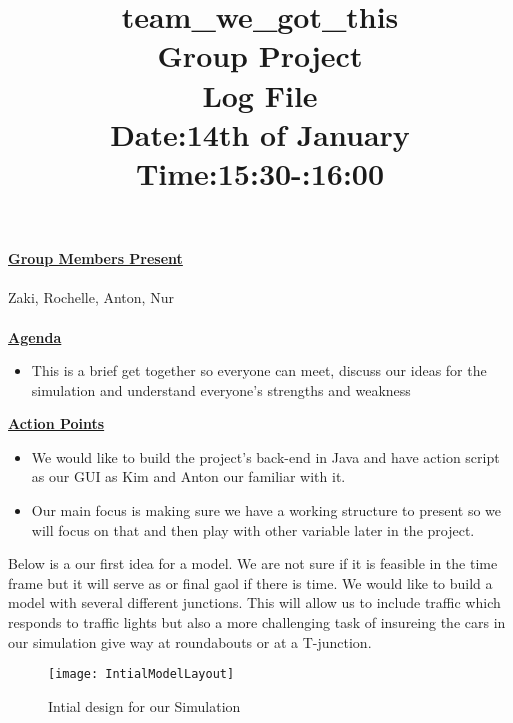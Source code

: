 \documentclass{article}
\begin{document}
	\title{team\_we\_got\_this\\ Group Project \\ Log File\\Date:14th of January\\Time:15:30-:16:00}
	
	\maketitle
	
	
	{\bf\underline{Group Members Present}}\\\\
	Zaki, Rochelle, Anton, Nur\\\\
		
	
{\underline	{\bf Agenda}}\\
	\begin{itemize}
		\item This is a brief get together so everyone can meet, discuss our ideas for the simulation and understand everyone's strengths and weakness
	\end{itemize}
	
	
	
	
	{\underline {\bf Action Points}}\\
	\begin{itemize}
		\item We would like to build the project's back-end in Java and have action script as our GUI as Kim and Anton our familiar with it. 
		\item Our main focus is making sure we have a working structure to present so we will focus on that and then play with other variable later in the project. 
	\end{itemize}
	
	
\newpage
\noindent Below is a our first idea for a model. We are not sure if it is feasible in the time frame but it will serve as or final gaol if there is time. We would like to build a model with several different junctions. This will allow us to include traffic which responds to traffic lights but also a more challenging task of insureing the cars in our simulation give way at roundabouts or at a T-junction.


\begin{figure}[h]
	\caption{Intial design for our Simulation}
	\centering
	\texttt{[image: IntialModelLayout]}
\end{figure}
\end{document}
